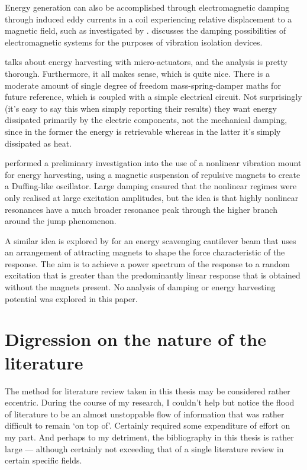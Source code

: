 Energy generation can also be accomplished through electromagnetic damping
through induced eddy currents in a coil experiencing relative displacement to
a magnetic field, such as investigated by \textcite{graves2000}.
 discusses the damping possibilities of electromagnetic
systems for the purposes of vibration isolation devices.

\textcite{stephen2006}
talks about energy harvesting with micro-actuators, and the analysis
is pretty thorough. Furthermore, it all makes sense, which is quite
nice. There is a moderate amount of single degree of freedom
mass-spring-damper maths for future reference, which is coupled with a
simple electrical circuit. Not surprisingly (it's easy to say this
when simply reporting their results) they want energy dissipated
primarily by the electric components, not the mechanical damping, since
in the former the energy is retrievable whereas in the latter it's simply
dissipated as heat.


\textcite{mann2008} performed a preliminary investigation into the use of a
nonlinear vibration mount for energy harvesting, using a magnetic suspension
of repulsive magnets to create a Duffing-like oscillator. Large damping
ensured that the nonlinear regimes were only realised at large excitation
amplitudes, but the idea is that highly nonlinear resonances have a much
broader resonance peak through the higher branch around the jump phenomenon.

A similar idea is explored by \textcite{shahruz2008} for an energy scavenging
cantilever beam that uses an arrangement of attracting magnets to shape the
force characteristic of the response. The aim is to achieve a power spectrum
of the response to a random excitation that is greater than the predominantly
linear response that is obtained without the magnets present. No analysis of 
damping or energy harvesting potential was explored in this paper.

\section{Digression on the nature of the literature}

The method for literature review taken in this thesis may be considered rather
eccentric. During the course of my research, I couldn't help but notice the
flood of literature to be an almost unstoppable flow of information that was
rather difficult to remain `on top of'. Certainly required some expenditure of
effort on my part. And perhaps to my detriment, the bibliography in this
thesis is rather large — although certainly not exceeding that of a single
literature review in certain specific fields.


